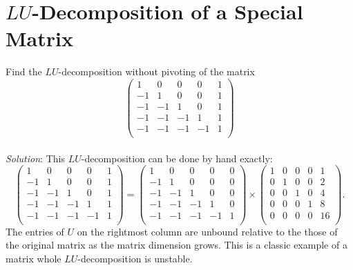 \documentclass[paper=a4, fontsize=11pt]{scrartcl} %
\numberwithin{equation}{section} %
\numberwithin{figure}{section} %
\numberwithin{table}{section} %
\begin{document}
\section{$LU$-Decomposition of a Special Matrix}
Find the $LU$-decomposition without pivoting of the matrix
$$
\begin{pmatrix}
1 & 0 & 0 & 0 & 1 \\
-1 & 1 & 0 & 0 & 1 \\
-1 & -1 & 1 & 0 & 1 \\
-1 & -1 & -1 & 1 & 1 \\
-1 & -1 & -1 & -1 & 1 \\
\end{pmatrix}
$$\\
\textit{Solution}: This $LU$-decomposition can be done by hand exactly:
$$
\begin{pmatrix}
1 & 0 & 0 & 0 & 1 \\
-1 & 1 & 0 & 0 & 1 \\
-1 & -1 & 1 & 0 & 1 \\
-1 & -1 & -1 & 1 & 1 \\
-1 & -1 & -1 & -1 & 1 \\
\end{pmatrix}
= \begin{pmatrix}
1 & 0 & 0 & 0 & 0 \\
-1 & 1 & 0 & 0 & 0 \\
-1 & -1 & 1 & 0 & 0 \\
-1 & -1 & -1 & 1 & 0 \\
-1 & -1 & -1 & -1 & 1 \\
\end{pmatrix}
\times
\begin{pmatrix}
1 & 0 & 0 & 0 & 1 \\
0 & 1 & 0 & 0 & 2 \\
0 & 0 & 1 & 0 & 4 \\
0 & 0 & 0 & 1 & 8 \\
0 & 0 & 0 & 0 & 16 \\
\end{pmatrix}.
$$
The entries of $U$ on the rightmost column are unbound relative to the those of the original matrix as the matrix dimension grows. This is a classic example of a matrix whole $LU$-decomposition is unstable.

\newpage
\end{document}
